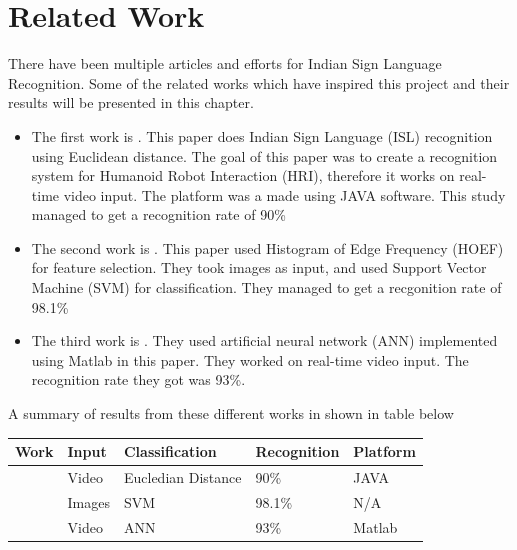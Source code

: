 \documentclass[a4paper,oneside,12pt]{report}
\begin{document}
\section{Related Work}
\label{sec:org910e990}
There have been multiple articles and efforts for Indian Sign Language Recognition. Some of the related works which have inspired this project and their results will be presented in this chapter.

\begin{itemize}
\item The first work is \citep{nandy2010recognizing}. This paper does Indian Sign Language (ISL) recognition using Euclidean distance. The goal of this paper was to create a recognition system for Humanoid Robot Interaction (HRI), therefore it works on real-time video input. The platform was a made using JAVA software. This study managed to get a recognition rate of 90\%
\item The second work is \citep{lilha2011evaluation}. This paper used Histogram of Edge Frequency (HOEF) for feature selection. They took images as input, and used Support Vector Machine (SVM) for classification. They managed to get a recgonition rate of 98.1\%
\item The third work is \citep{kishore2011video}. They used artificial neural network (ANN) implemented using Matlab in this paper. They worked on real-time video input. The recognition rate they got was 93\%.
\end{itemize}

A summary of results from these different works in shown in table below

\begin{center}
\begin{tabular}{lllll}
Work & Input & Classification & Recognition & Platform\\
\hline
\citep{nandy2010recognizing} & Video & Eucledian Distance & 90\% & JAVA\\
\citep{lilha2011evaluation} & Images & SVM & 98.1\% & N/A\\
\citep{kishore2011video} & Video & ANN & 93\% & Matlab\\
\end{tabular}
\end{center}
\end{document}

